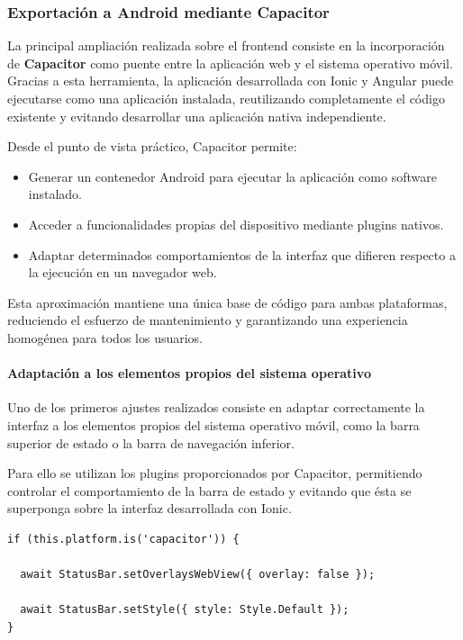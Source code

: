 \subsubsection{Exportación a Android mediante Capacitor}

La principal ampliación realizada sobre el frontend consiste en la incorporación de \textbf{Capacitor} como puente entre la aplicación web y el sistema operativo móvil. Gracias a esta herramienta, la aplicación desarrollada con Ionic y Angular puede ejecutarse como una aplicación instalada, reutilizando completamente el código existente y evitando desarrollar una aplicación nativa independiente.

Desde el punto de vista práctico, Capacitor permite:

\begin{itemize}
    \item Generar un contenedor Android para ejecutar la aplicación como software instalado.
    \item Acceder a funcionalidades propias del dispositivo mediante plugins nativos.
    \item Adaptar determinados comportamientos de la interfaz que difieren respecto a la ejecución en un navegador web.
\end{itemize}

Esta aproximación mantiene una única base de código para ambas plataformas, reduciendo el esfuerzo de mantenimiento y garantizando una experiencia homogénea para todos los usuarios.

\paragraph{Adaptación a los elementos propios del sistema operativo}

Uno de los primeros ajustes realizados consiste en adaptar correctamente la interfaz a los elementos propios del sistema operativo móvil, como la barra superior de estado o la barra de navegación inferior.

Para ello se utilizan los plugins proporcionados por Capacitor, permitiendo controlar el comportamiento de la barra de estado y evitando que ésta se superponga sobre la interfaz desarrollada con Ionic.

\begin{Verbatim}[frame=single, fontsize=\small, xleftmargin=10pt, xrightmargin=10pt]
if (this.platform.is('capacitor')) {

  await StatusBar.setOverlaysWebView({ overlay: false });

  await StatusBar.setStyle({ style: Style.Default });
}
\end{Verbatim}

